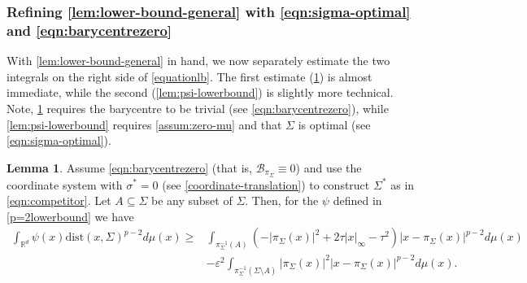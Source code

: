 \documentclass[preprint, reqno]{amsart}
\renewcommand{\epsilon}{\varepsilon}
\renewcommand{\subset}{\subseteq}
\newcommand{\dist}{\mathrm{dist}}
\theoremstyle{definition}
\newtheorem{lemma}[definition]{Lemma}
\numberwithin{equation}{section}
\begin{document}
\subsubsection{Refining \cref{lem:lower-bound-general} with
  \eqref{eqn:sigma-optimal} and \eqref{eqn:barycentrezero}}
With \cref{lem:lower-bound-general} in hand, we now separately
estimate the two integrals on the right side of \eqref{equationlb}.
The first estimate (\cref{lem:psi-integral}) is almost immediate,
while the second (\cref{lem:psi-lowerbound}) is slightly more
technical. Note, \cref{lem:psi-integral} requires the barycentre to be
trivial (see \eqref{eqn:barycentrezero}), while
\cref{lem:psi-lowerbound} requires \eqref{assum:zero-mu} and that
$\Sigma$ is optimal (see \eqref{eqn:sigma-optimal}).
\begin{lemma}\label{lem:psi-integral}
  Assume \eqref{eqn:barycentrezero} (that is,
  $\mathcal{B}_{\pi_{\Sigma}}\equiv 0$) and use the coordinate system
  with $\sigma^* = 0$ (see \eqref{coordinate-translation}) to construct
  $\Sigma^*$ as in \eqref{eqn:competitor}. Let $A \subset \Sigma$ be
  any subset of $\Sigma$. Then, for the $\psi$ defined in
  \cref{p=2lowerbound} we have
  \begin{equation}\label{firstterm}
    \begin{split}
      \int_{\mathbb{R}^d}\psi(x)\dist(x, \Sigma)^{p-2} d\mu(x) \ge
      & \int_{\pi_{\Sigma}^{-1}(A)}(-|\pi_{\Sigma}(x)|^2 + 2 \tau |x
        |_{\infty} - \tau^2)|x - \pi_{\Sigma}(x)|^{p-2}d\mu(x) \\
      &-\epsilon^2 \int_{\pi_{\Sigma}^{-1}(\Sigma \setminus
        A)}|\pi_{\Sigma}(x)|^2 |x - \pi_{\Sigma}(x)|^{p-2}d\mu(x).
    \end{split}
  \end{equation}
\end{lemma}
\end{document}
